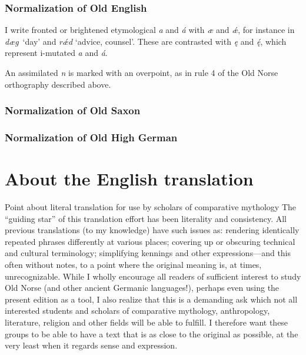     \subsubsection{Normalization of Old English}
    I write fronted or brightened etymological \emph{a} and \emph{á} with \emph{æ} and \emph{ǽ}, for instance in \emph{dæg} ‘day’ and \emph{rǽd} ‘advice, counsel’.  These are contrasted with \emph{ę} and \emph{ę́}, which represent i-mutated \emph{a} and \emph{á}.

    An assimilated \emph{n} is marked with an overpoint, as in rule 4 of the Old Norse orthography described above.

    \subsubsection{Normalization of Old Saxon}

    \subsubsection{Normalization of Old High German}

  \section{About the English translation}
    Point about literal translation for use by scholars of comparative mythology
      The “guiding star” of this translation effort has been literality and consistency. All previous translations (to my knowledge) have such issues as: rendering identically repeated phrases differently at various places; covering up or obscuring technical and cultural terminology; simplifying kennings and other expressions—and this often without notes, to a point where the original meaning is, at times, unrecognizable.
      While I wholly encourage all readers of sufficient interest to study Old Norse (and other ancient Germanic languages!), perhaps even using the present edition as a tool, I also realize that this is a demanding ask which not all interested students and scholars of comparative mythology, anthropology, literature, religion and other fields will be able to fulfill. I therefore want these groups to be able to have a text that is as close to the original as possible, at the very least when it regards sense and expression.
